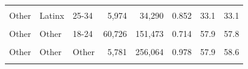 \begin{table}
\begin{tabular}[t]{lllrrrrr}
\cellcolor{gray!10}{Other} & \cellcolor{gray!10}{Latinx} & \cellcolor{gray!10}{18-24} & \cellcolor{gray!10}{11,145} & \cellcolor{gray!10}{23,709} & \cellcolor{gray!10}{0.680} & \cellcolor{gray!10}{39.3} & \cellcolor{gray!10}{39.2}\\
Other & Latinx & 25-34 & 5,974 & 34,290 & 0.852 & 33.1 & 33.1\\
\cellcolor{gray!10}{Other} & \cellcolor{gray!10}{Latinx} & \cellcolor{gray!10}{Other} & \cellcolor{gray!10}{2,835} & \cellcolor{gray!10}{39,268} & \cellcolor{gray!10}{0.933} & \cellcolor{gray!10}{42.6} & \cellcolor{gray!10}{42.0}\\
Other & Other & 18-24 & 60,726 & 151,473 & 0.714 & 57.9 & 57.8\\
\cellcolor{gray!10}{Other} & \cellcolor{gray!10}{Other} & \cellcolor{gray!10}{25-34} & \cellcolor{gray!10}{28,067} & \cellcolor{gray!10}{227,248} & \cellcolor{gray!10}{0.890} & \cellcolor{gray!10}{48.3} & \cellcolor{gray!10}{48.1}\\
Other & Other & Other & 5,781 & 256,064 & 0.978 & 57.9 & 58.6\\
\cellcolor{gray!10}{} & \cellcolor{gray!10}{} & \cellcolor{gray!10}{Total} & \cellcolor{gray!10}{287,735} & \cellcolor{gray!10}{1,711,547} & \cellcolor{gray!10}{0.856} & \cellcolor{gray!10}{54.6} & \cellcolor{gray!10}{54.6}\\
\bottomrule
\end{tabular}
\end{table}
